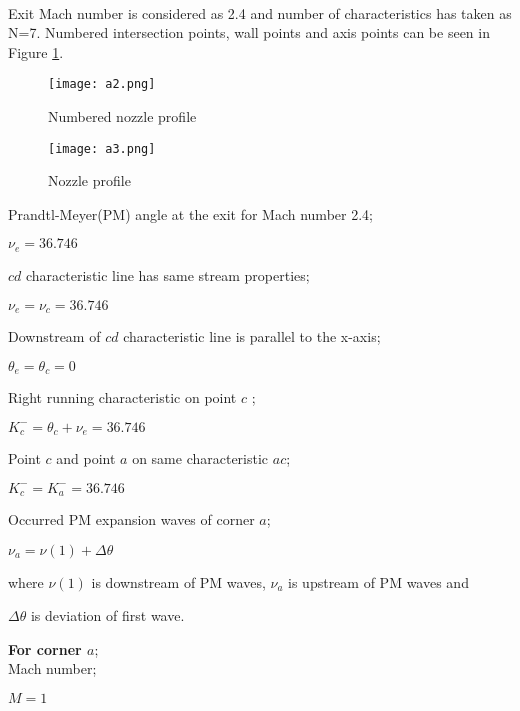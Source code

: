 \begin{appendices}
\begin{figure}[!htb]
\end{figure}
\FloatBarrier

\\

\noindent Exit Mach number is considered as 2.4 and number of characteristics has taken as N=7. Numbered intersection points, wall points and axis points can be seen in Figure \ref{fig:a2}.

\FloatBarrier
\begin{figure}[!htb]
	\centering
	\texttt{[image: a2.png]}
	\caption{Numbered nozzle profile}	
	\label{fig:a2}
\end{figure}
\FloatBarrier

\pagebreak

\FloatBarrier
\begin{figure}[!htb]
	\centering
	\texttt{[image: a3.png]}
	\caption{Nozzle profile}	
	\label{fig:a3}
\end{figure}
\FloatBarrier

Prandtl-Meyer(PM) angle at the exit for Mach number 2.4;

 $\nu_e = 36.746$

$cd$ characteristic line has same stream properties; 

$\nu_e = \nu_c = 36.746$

Downstream of $cd$ characteristic line is parallel to the x-axis; 

$\theta_e = \theta_c = 0$

Right running characteristic on point $c$ ; 

$K_c^- = \theta_c + \nu_e = 36.746$

Point $c$ and point $a$ on same characteristic $ac$;

$K_c^- = K_a^- = 36.746$

Occurred PM expansion waves of corner $a$;

$\nu_a = \nu(1)+\Delta\theta$

where $\nu(1)$ is downstream of PM waves, $\nu_a$ is upstream of PM waves and 

$\Delta\theta$ is deviation of first wave.\\

\begin{minipage}{0.5\textwidth}
	
	\textbf{For corner $a$};\\
	
	Mach number;
	
	$M = 1$
	

\end{minipage}
\end{appendices}
